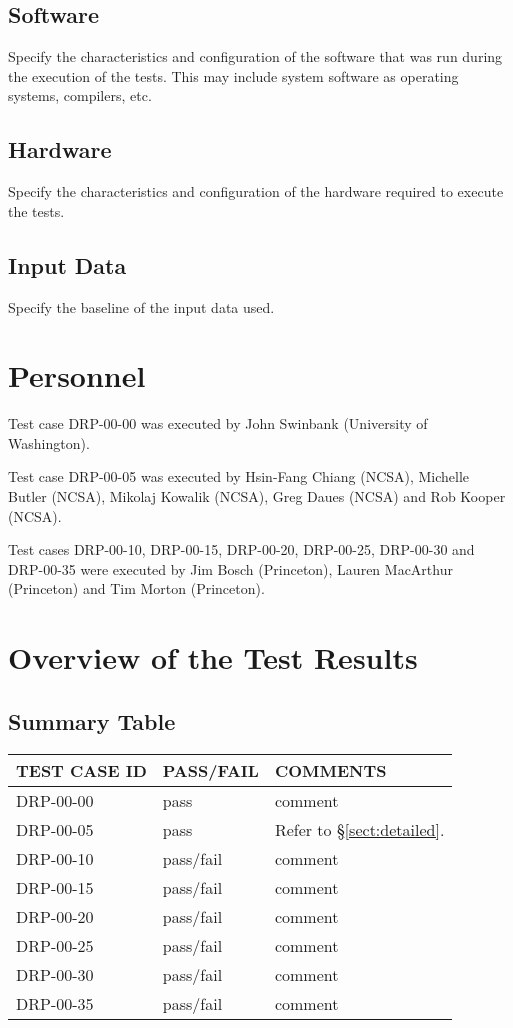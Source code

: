 \documentclass[DM,lsstdraft,STR,toc]{lsstdoc}
\begin{document}
\subsection{Software \label{sect:swconf}}
Specify the characteristics and configuration of the software that was run during the execution of the tests. This may include
system software as operating systems, compilers, etc.
\subsection{Hardware \label{sect:hwconf}}
Specify the characteristics and configuration of the hardware required to execute the tests.
\subsection{Input Data \label{sect:inputdata}}
Specify the baseline of the input data used.

\section{Personnel}
\label{sect:personnel}

Test case DRP-00-00 was executed by John Swinbank (University of Washington).

Test case DRP-00-05 was executed by Hsin-Fang Chiang (NCSA), Michelle Butler (NCSA), Mikolaj Kowalik (NCSA), Greg Daues (NCSA) and Rob Kooper (NCSA).

Test cases DRP-00-10, DRP-00-15, DRP-00-20, DRP-00-25, DRP-00-30 and DRP-00-35 were executed by Jim Bosch (Princeton), Lauren MacArthur (Princeton) and Tim Morton (Princeton).

\newpage

\section{Overview of the Test Results}
\label{sect:overview}

\subsection{Summary Table}
\label{sect:summarytable}

\begin{longtable} {|p{}|p{}|p{}|}\hline
{\bf TEST CASE ID} & {\bf PASS/FAIL} & {\bf COMMENTS} \\\hline
DRP-00-00 & pass & comment \\\hline
DRP-00-05 & pass & Refer to \S\ref{sect:detailed}. \\\hline
DRP-00-10 & pass/fail & comment \\\hline
DRP-00-15 & pass/fail & comment \\\hline
DRP-00-20 & pass/fail & comment \\\hline
DRP-00-25 & pass/fail & comment \\\hline
DRP-00-30 & pass/fail & comment \\\hline
DRP-00-35 & pass/fail & comment \\\hline
\end{longtable}
\end{document}
